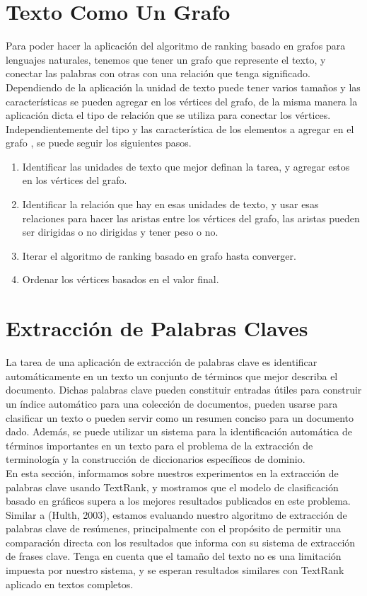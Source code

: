 \documentclass[conference]{IEEEtran}
\begin{document}
\section{Texto Como Un Grafo}
Para poder hacer la aplicación del algoritmo de ranking basado en grafos para lenguajes naturales, tenemos que tener un grafo que represente el texto, y conectar las palabras con otras con una relación que tenga significado. Dependiendo de la aplicación la unidad de texto puede tener varios tamaños y las características se pueden agregar en los vértices del grafo, de la misma manera la aplicación dicta el tipo de relación que se utiliza para conectar los vértices. \\
Independientemente del tipo y las característica de los elementos a agregar en el grafo , se puede seguir los siguientes pasos. \\

\begin{enumerate}
  \item Identificar las unidades de texto que mejor definan la tarea, y agregar estos en los vértices del grafo.
  \item Identificar la relación que hay en esas unidades de texto, y usar esas relaciones para hacer las aristas entre los vértices del grafo, las aristas pueden ser dirigidas o no dirigidas y tener peso o no.
  \item Iterar el algoritmo de ranking basado en grafo hasta converger.
  \item Ordenar los vértices basados en el valor final.
\end{enumerate}

\section{Extracción de Palabras Claves}
La tarea de una aplicación de extracción de palabras clave es identificar automáticamente en un texto un conjunto de términos que mejor describa el documento. Dichas palabras clave pueden constituir entradas útiles para construir un índice automático para una colección de documentos, pueden usarse para clasificar un texto o pueden servir como un resumen conciso para un documento dado. Además, se puede utilizar un sistema para la identificación automática de términos importantes en un texto para el problema de la extracción de terminología y la construcción de diccionarios específicos de dominio.\\
En esta sección, informamos sobre nuestros experimentos en la extracción de palabras clave usando TextRank, y mostramos que el modelo de clasificación basado en gráficos supera a los mejores resultados publicados en este problema. Similar a (Hulth, 2003), estamos evaluando nuestro algoritmo de extracción de palabras clave de resúmenes, principalmente con el propósito de permitir una comparación directa con los resultados que informa con su sistema de extracción de frases clave. Tenga en cuenta que el tamaño del texto no es una limitación impuesta por nuestro sistema, y se esperan resultados similares con TextRank aplicado en textos completos.\\
\end{document}
